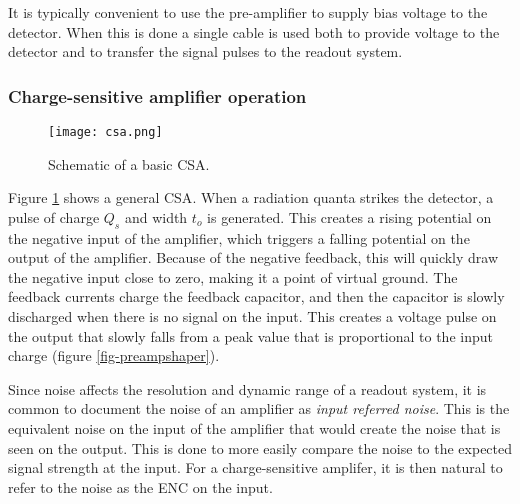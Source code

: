 \documentclass[../main/thesis.tex]{subfiles}
\begin{document}
It is typically convenient to use the pre-amplifier to supply bias voltage to the detector. When this is done a single cable is used both to provide voltage to the detector and to transfer the signal pulses to the readout system. \citep[chap. 16]{Knoll}


\subsubsection{Charge-sensitive amplifier operation}
\label{t-csa}
\begin{figure}%
	\centering
	\texttt{[image: csa.png]}
	\caption{Schematic of a basic \gls{CSA}. \citep{Hamamatsu}}
	\label{fig-csa}
\end{figure}

Figure \ref{fig-csa} shows a general \gls{CSA}. When a radiation quanta strikes the detector, a pulse of charge $Q_s$ and width $t_o$ is generated. This creates a rising potential on the negative input of the amplifier, which triggers a falling potential on the output of the amplifier. Because of the negative feedback, this will quickly draw the negative input close to zero, making it a point of virtual ground. The feedback currents charge the feedback capacitor, and then the capacitor is slowly discharged when there is no signal on the input. This creates a voltage pulse on the output that slowly falls from a peak value that is proportional to the input charge (figure \ref{fig-preampshaper}). \citep{Hamamatsu}



Since noise affects the resolution and dynamic range of a readout system, it is common to document the noise of an amplifier as \textit{input referred noise}. This is the equivalent noise on the input of the amplifier that would create the noise that is seen on the output. This is done to more easily compare the noise to the expected signal strength at the input. For a charge-sensitive amplifer, it is then natural to refer to the noise as the \acrfull{ENC} on the input.  
\\
\end{document}
